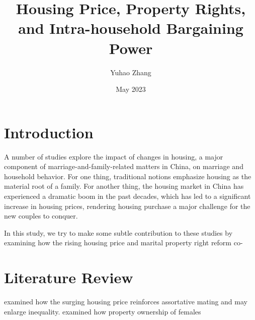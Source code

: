 \documentclass[11pt]{article}
\title{Housing Price, Property Rights, and Intra-household Bargaining Power}
\author{Yuhao Zhang}
\date{May 2023}
\begin{document}
\maketitle
\begin{abstract}
    
\end{abstract}

\section{Introduction}
A number of studies explore the impact of changes in housing, a major component of marriage-and-family-related matters in China, on marriage and household behavior. For one thing, traditional notions emphasize housing as the material root of a family. For another thing, the housing market in China has experienced a dramatic boom in the past decades, which has led to a significant increase in housing prices, rendering housing purchase a major challenge for the new couples to conquer. 

In this study, we try to make some subtle contribution to these studies by examining how the rising housing price and marital property right reform co-

\section{Literature Review}
\citet{SUN2020102492} examined how the surging housing price reinforces assortative mating and may enlarge inequality. \citet{WANG2014192} examined how property ownership of females 




\end{document}
